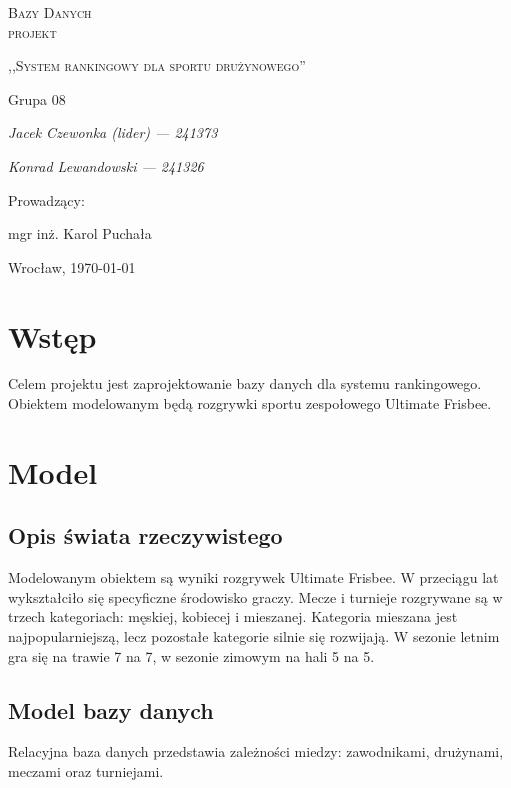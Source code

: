 \documentclass[polish, 11pt]{article}
\begin{document}
\begin{titlepage}
    \centering
    {\scshape\LARGE  Bazy Danych \\ projekt \par}
    \vspace{1cm}
    {\scshape\Large ,,System rankingowy dla sportu drużynowego''\par}
    \vspace{2cm}
 
    Grupa 08\par
    {\itshape\Large Jacek Czewonka (lider) --- 241373\/\par}
    {\itshape\Large Konrad Lewandowski --- 241326\/\par}
    \vfill
    Prowadzący:\par
    mgr inż. Karol Puchała

    \vfill

    {\large Wrocław, \today\par}

\end{titlepage}

\tableofcontents
\newpage

\section{Wstęp}
	Celem projektu jest zaprojektowanie bazy danych dla systemu rankingowego. Obiektem modelowanym będą rozgrywki sportu zespołowego Ultimate Frisbee.

\section{Model}
    \subsection{Opis świata rzeczywistego }
	    Modelowanym  obiektem są wyniki rozgrywek Ultimate Frisbee. W przeciągu lat wykształciło się specyficzne środowisko graczy. Mecze i turnieje rozgrywane są w trzech kategoriach: męskiej, kobiecej i mieszanej. Kategoria mieszana jest najpopularniejszą, lecz pozostałe kategorie silnie się rozwijają. W sezonie letnim gra się na trawie 7 na 7, w sezonie zimowym na hali 5 na 5.
		 \subsection{Model bazy danych }
		 	Relacyjna baza danych przedstawia zależności miedzy: zawodnikami,  drużynami, meczami oraz turniejami.
\end{document}
